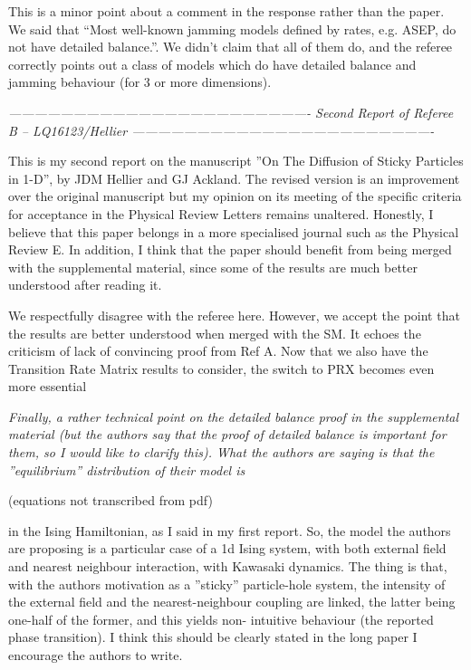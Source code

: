 \documentclass[a4paper,10pt]{article}
\begin{document}
This is a minor point about a comment in the response rather than the
paper.  We said that ``Most well-known jamming models defined by
rates, e.g. ASEP, do not have detailed balance.''.  We didn't claim
that all of them do, and the referee correctly points out a class of
models which do have detailed balance and jamming behaviour (for 3 or
more dimensions).



{\it
----------------------------------------------------------------------
Second Report of Referee B -- LQ16123/Hellier
----------------------------------------------------------------------

This is my second report on the manuscript ”On The Diffusion of Sticky
Particles in 1-D”, by JDM Hellier and GJ Ackland. The revised version
is an improvement over the original manuscript but my opinion on its
meeting of the specific criteria for acceptance in the Physical Review
Letters remains unaltered. Honestly, I believe that this paper belongs
in a more specialised journal such as the Physical Review E.  In
addition, I think that the paper should benefit from being merged with
the supplemental material, since some of the results are much better
understood after reading it.  } 


We respectfully disagree with the referee here.  However, we accept
the point that the results are better understood when merged with the
SM.  It echoes the criticism of lack of convincing proof from Ref A.
Now that we also have the Transition Rate Matrix results to consider,
the switch to PRX becomes even more essential

{\it 
Finally, a rather technical point on the detailed balance proof in the supplemental material (but the authors say that the proof of detailed balance
is important for them, so I would like to clarify this). What the authors are
saying is that the ”equilibrium” distribution of their model is 

(equations not transcribed from pdf)

in the Ising Hamiltonian, as I said in my first report. So, the model the
authors are proposing is a particular case of a 1d Ising system, with both
external field and nearest neighbour interaction, with Kawasaki dynamics.
The thing is that, with the authors motivation as a ”sticky” particle-hole
system, the intensity of the external field and the nearest-neighbour coupling
are linked, the latter being one-half of the former, and this yields non-
intuitive behaviour (the reported phase transition). I think this should be
clearly stated in the long paper I encourage the authors to write.}
\end{document}
